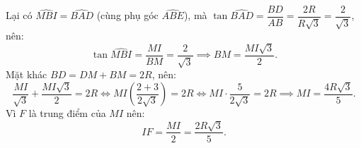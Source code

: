 \begin{bt}
{\begin{enumerate}[a)]
    Lại có $\widehat{MBI} = \widehat{BAD}$ (cùng phụ góc $\widehat{ABE}$), mà $\tan \widehat{BAD} = \dfrac{BD}{AB} = \dfrac{2R}{R\sqrt{3}} = \dfrac{2}{\sqrt{3}}$, nên:
    $$\tan \widehat{MBI} = \dfrac{MI}{BM} = \dfrac{2}{\sqrt{3}} \implies BM = \dfrac{MI\sqrt{3}}{2}.$$
    Mặt khác $BD = DM + BM = 2R$, nên:
    $$\dfrac{MI}{\sqrt{3}} + \dfrac{MI\sqrt{3}}{2} = 2R \iff MI\left(\dfrac{2 + 3}{2\sqrt{3}}\right) = 2R \iff MI \cdot \dfrac{5}{2\sqrt{3}} = 2R \implies MI = \dfrac{4R\sqrt{3}}{5}.$$
    Vì $F$ là trung điểm của $MI$ nên:
    $$IF = \dfrac{MI}{2} = \dfrac{2R\sqrt{3}}{5}.$$
\end{enumerate}
}
\end{bt}
